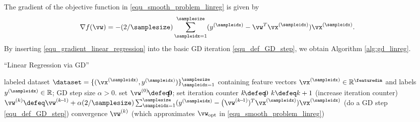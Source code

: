 \documentclass[12pt]{report}
\begin{document}
The gradient of the objective function in \eqref{equ_smooth_problem_linreg} is given by 
\begin{equation}
\label{equ_gradient_linear_regression}
\nabla f(\vw) = -(2/\samplesize) \sum_{\sampleidx=1}^{\samplesize} (y^{(\sampleidx)} - \vw^{T} \vx^{(\sampleidx)}) \vx^{(\sampleidx)}.
\end{equation} 
By inserting \eqref{equ_gradient_linear_regression} into the basic GD iteration \eqref{equ_def_GD_step}, we obtain Algorithm \ref{alg:gd_linreg}. 
\begin{algorithm}[htbp]
\caption{``Linear Regression via GD''}\label{alg:gd_linreg}
\begin{algorithmic}[1]
\renewcommand{\algorithmicrequire}{\textbf{Input:}}
\renewcommand{\algorithmicensure}{\textbf{Output:}}
\Require   labeled dataset $\dataset=\{ (\vx^{(\sampleidx)}, y^{(\sampleidx)}) \}_{\sampleidx=1}^{\samplesize}$ containing feature vectors 
$\vx^{(\sampleidx)} \in \mathbb{R}^{\featuredim}$ and labels $y^{(\sampleidx)} \in \mathbb{R}$; GD step size $\alpha >0$. 
\Statex\hspace{-6mm}{\bf Initialize:} set $\vw^{(0)}\!\defeq\!\mathbf{0}$; set iteration counter $k\!\defeq\!0$   
\Repeat 
\State $k \defeq k +1$    (increase iteration counter) 
\State  $\vw^{(k)} \defeq \vw^{(k\!-\!1)} + \alpha (2/\samplesize) \sum_{\sampleidx=1}^{\samplesize} (y^{(\sampleidx)} - \big(\vw^{(k\!-\!1)})^{T} \vx^{(\sampleidx)}) \vx^{(\sampleidx)}$  (do a GD step \eqref{equ_def_GD_step})
\Until convergence 
\Ensure $\vw^{(k)}$ (which approximates $\vw_{\rm opt}$ in \eqref{equ_smooth_problem_linreg})
\end{algorithmic}
\end{algorithm}
\end{document}
